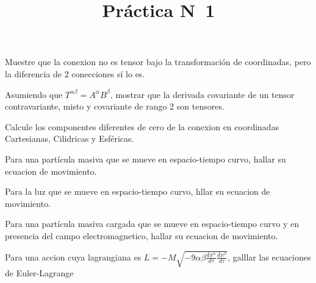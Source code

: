 \documentclass[12pt,a4paper]{practice}
\begin{document}
    \title{Práctica N\textdegree\ 1}
    \maketitle

    \begin{problem}\label{prob:1}
        Muestre que la conexion no es tensor bajo la transformación de coordinadas, pero la diferencia de 2 conecciones sí lo es.
    \end{problem}

    \begin{problem}\label{prob:2}
        Asumiendo que $T^{\alpha\beta} = A^{\alpha} B^{\beta}$, mostrar que la derivada covariante de un tensor contravariante, misto y covariante de rango 2 son tensores.    
    \end{problem}
    
    \begin{problem}\label{prob:3}
        Calcule los componentes diferentes de cero de la conexion en coordinadas Cartesianas, Cilidricas y Esféricas.
    \end{problem}
    
    \begin{problem}\label{prob:4}
        Para una partícula masiva que se mueve en espacio-tiempo curvo, hallar su ecuacion de movimiento.    
    \end{problem}

    \begin{problem}\label{prob:5}
        Para la luz que se mueve en espacio-tiempo curvo, hllar su ecuacion de movimiento.    
    \end{problem}
    
    \begin{problem}\label{prob:6}
        Para una partícula masiva cargada que se mueve en espacio-tiempo curvo y en presencia del campo electromagnetico, hallar su ecuacion de movimiento.
    \end{problem}
    
    \begin{problem}\label{prob:7}
        Para una accion cuya lagrangiana es $L = - M\sqrt{-9\alpha\beta\frac{d x^{\alpha}}{d\tau}\frac{dx^{\beta}}{d\tau}}$, galllar las ecuaciones de Euler-Lagrange
    \end{problem}
    
\end{document}
